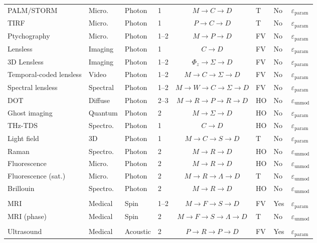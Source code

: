 \documentclass[11pt,a4paper]{article}
\newcommand{\eps}{\varepsilon}
\begin{document}
\begin{table}[htbp]
\begin{tabularx}{\textwidth}{@{}llllclll@{}}
PALM/STORM & Micro. & Photon & 1 & $M \to C \to D$ & T & No & $\eps_{\text{param}}$ \\
TIRF & Micro. & Photon & 1 & $P \to C \to D$ & T & No & $\eps_{\text{param}}$ \\
Ptychography & Micro. & Photon & 1--2 & $M \to P \to D$ & FV & No & $\eps_{\text{param}}$ \\
Lensless & Imaging & Photon & 1 & $C \to D$ & FV & No & $\eps_{\text{param}}$ \\
3D Lensless & Imaging & Photon & 1--2 & $\Phi_z \to \Sigma \to D$ & FV & No & $\eps_{\text{param}}$ \\
Temporal-coded lensless & Video & Photon & 1--2 & $M \to C \to \Sigma \to D$ & FV & No & $\eps_{\text{param}}$ \\
Spectral lensless & Spectral & Photon & 1--2 & $M \to W \to C \to \Sigma \to D$ & FV & No & $\eps_{\text{param}}$ \\
DOT & Diffuse & Photon & 2--3 & $M \to R \to P \to R \to D$ & HO & No & $\eps_{\text{unmod}}$ \\
Ghost imaging & Quantum & Photon & 2 & $M \to \Sigma \to D$ & HO & No & $\eps_{\text{param}}$ \\
THz-TDS & Spectro. & Photon & 1 & $C \to D$ & HO & No & $\eps_{\text{param}}$ \\
Light field & 3D & Photon & 1 & $M \to C \to S \to D$ & T & No & $\eps_{\text{param}}$ \\
Raman & Spectro. & Photon & 2 & $M \to R \to D$ & HO & No & $\eps_{\text{unmod}}$ \\
Fluorescence & Micro. & Photon & 2 & $M \to R \to D$ & HO & No & $\eps_{\text{unmod}}$ \\
Fluorescence (sat.) & Micro. & Photon & 2 & $M \to R \to \Lambda \to D$ & T & No & $\eps_{\text{unmod}}$ \\
Brillouin & Spectro. & Photon & 2 & $M \to R \to D$ & HO & No & $\eps_{\text{unmod}}$ \\
\addlinespace
\multicolumn{8}{@{}l}{\textit{Spin}} \\
MRI & Medical & Spin & 1--2 & $M \to F \to S \to D$ & FV & Yes & $\eps_{\text{param}}$ \\
MRI (phase) & Medical & Spin & 2 & $M \to F \to S \to \Lambda \to D$ & T & No & $\eps_{\text{unmod}}$ \\
\addlinespace
\multicolumn{8}{@{}l}{\textit{Acoustic}} \\
Ultrasound & Medical & Acoustic & 2 & $P \to R \to P \to D$ & FV & Yes & $\eps_{\text{param}}$ \\

\end{tabularx}
\end{table}
\end{document}
